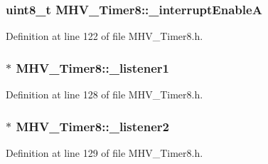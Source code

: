 \hypertarget{class_m_h_v___timer8_ad2fac7586dc6104b1c7323c84ba88559}{
\subsubsection[{\-\_\-interrupt\-Enable\-A}]{\setlength{\rightskip}{0pt plus 5cm}uint8\-\_\-t {\bf \-M\-H\-V\-\_\-\-Timer8\-::\-\_\-interrupt\-Enable\-A}}}
\label{class_m_h_v___timer8_ad2fac7586dc6104b1c7323c84ba88559}


\-Definition at line 122 of file \-M\-H\-V\-\_\-\-Timer8.\-h.

\hypertarget{class_m_h_v___timer8_a055679c1951c9667749f71e549eb8ccf}{
\subsubsection[{\-\_\-listener1}]{$\ast$ {\bf \-M\-H\-V\-\_\-\-Timer8\-::\-\_\-listener1}}}
\label{class_m_h_v___timer8_a055679c1951c9667749f71e549eb8ccf}


\-Definition at line 128 of file \-M\-H\-V\-\_\-\-Timer8.\-h.

\hypertarget{class_m_h_v___timer8_a3e44a703c1e5c578fb98294f560337b3}{
\subsubsection[{\-\_\-listener2}]{$\ast$ {\bf \-M\-H\-V\-\_\-\-Timer8\-::\-\_\-listener2}}}
\label{class_m_h_v___timer8_a3e44a703c1e5c578fb98294f560337b3}


\-Definition at line 129 of file \-M\-H\-V\-\_\-\-Timer8.\-h.

